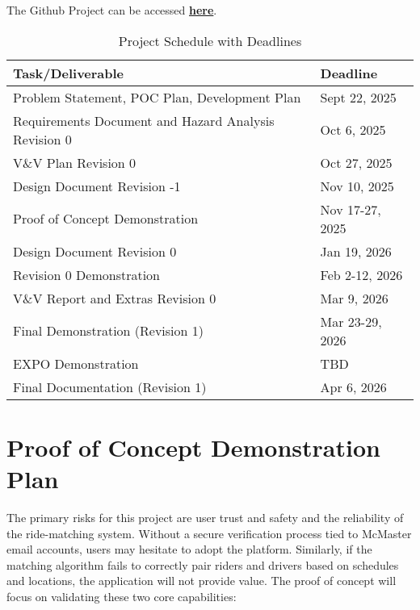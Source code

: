 \documentclass{article}
\begin{document}
\noindent The Github Project can be accessed \href{https://github.com/orgs/hitchly/projects/2/views/1}{\bf here}.\\


\begin{table}[h!]
  \centering
  \begin{tabular}{|l|l|}
  \hline
  \textbf{Task/Deliverable} & \textbf{Deadline} \\
  \hline
  Problem Statement, POC Plan, Development Plan & Sept 22, 2025 \\
  \hline
  Requirements Document and Hazard Analysis Revision 0 & Oct 6, 2025 \\
  \hline
  V\&V Plan Revision 0  & Oct 27, 2025 \\
  \hline
  Design Document Revision -1  & Nov 10, 2025 \\
  \hline
  Proof of Concept Demonstration & Nov 17-27, 2025 \\
  \hline
  Design Document Revision 0           & Jan 19, 2026 \\
  \hline
  Revision 0 Demonstration & Feb 2-12, 2026 \\
  \hline
  V\&V Report and Extras Revision 0 & Mar 9, 2026 \\
  \hline
  Final Demonstration (Revision 1) & Mar 23-29, 2026 \\
  \hline
  EXPO Demonstration & TBD \\
  \hline
  Final Documentation (Revision 1) & Apr 6, 2026 \\
  \hline
  \end{tabular}
  \caption{Project Schedule with Deadlines}
  \label{tab:schedule}
  \end{table}

\section{Proof of Concept Demonstration Plan}


The primary risks for this project are user trust and safety and the reliability of the ride-matching system.
Without a secure verification process tied to McMaster email accounts, users may hesitate to adopt the platform.
Similarly, if the matching algorithm fails to correctly pair riders and drivers based on schedules and locations, the application will not provide value.
The proof of concept will focus on validating these two core capabilities:
\end{document}
